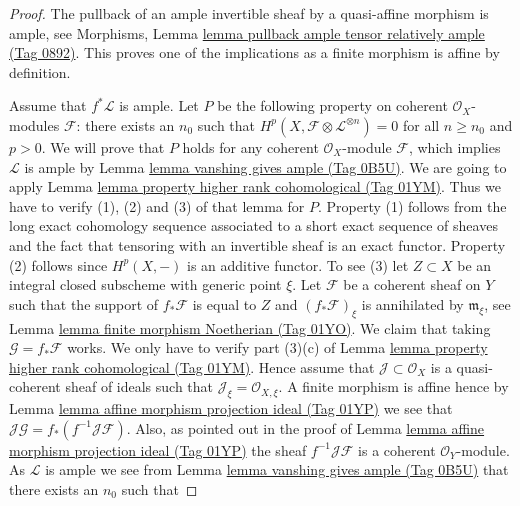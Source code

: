 \documentclass{amsart}
\theoremstyle{plain}
\theoremstyle{definition}
\theoremstyle{remark}
\numberwithin{equation}{subsection}
\begin{document}
\begin{proof}
The pullback of an ample invertible sheaf by a quasi-affine morphism
is ample, see Morphisms, Lemma
\href{https://stacks.math.columbia.edu/tag/0892}{lemma pullback ample tensor relatively ample (Tag 0892)}.
This proves one of the implications as a finite morphism is affine
by definition.

\medskip\noindent
Assume that $f^*\mathcal{L}$ is ample. Let $P$ be the following property on
coherent $\mathcal{O}_X$-modules $\mathcal{F}$: there exists an $n_0$
such that $H^p(X, \mathcal{F} \otimes \mathcal{L}^{\otimes n}) = 0$
for all $n \geq n_0$ and $p > 0$. We will prove that $P$ holds
for any coherent $\mathcal{O}_X$-module $\mathcal{F}$, which implies
$\mathcal{L}$ is ample by Lemma \href{https://stacks.math.columbia.edu/tag/0B5U}{lemma vanshing gives ample (Tag 0B5U)}.
We are going to apply Lemma \href{https://stacks.math.columbia.edu/tag/01YM}{lemma property higher rank cohomological (Tag 01YM)}.
Thus we have to verify (1), (2) and (3) of that lemma for $P$.
Property (1) follows from the long exact cohomology sequence associated
to a short exact sequence of sheaves and the fact that tensoring with
an invertible sheaf is an exact functor. Property (2) follows since
$H^p(X, -)$ is an additive functor. To see (3) let $Z \subset X$ be
an integral closed subscheme with generic point $\xi$.
Let $\mathcal{F}$ be a coherent sheaf on $Y$ such that
the support of $f_*\mathcal{F}$ is equal to $Z$
and $(f_*\mathcal{F})_\xi$ is annihilated by $\mathfrak m_\xi$,
see Lemma \href{https://stacks.math.columbia.edu/tag/01YO}{lemma finite morphism Noetherian (Tag 01YO)}. We claim that
taking $\mathcal{G} = f_*\mathcal{F}$ works. We only have to verify
part (3)(c) of Lemma \href{https://stacks.math.columbia.edu/tag/01YM}{lemma property higher rank cohomological (Tag 01YM)}.
Hence assume that $\mathcal{J} \subset \mathcal{O}_X$ is a
quasi-coherent sheaf of ideals such that
$\mathcal{J}_\xi = \mathcal{O}_{X, \xi}$.
A finite morphism is affine hence by
Lemma \href{https://stacks.math.columbia.edu/tag/01YP}{lemma affine morphism projection ideal (Tag 01YP)} we see that
$\mathcal{J}\mathcal{G} = f_*(f^{-1}\mathcal{J}\mathcal{F})$.
Also, as pointed out in the proof of
Lemma \href{https://stacks.math.columbia.edu/tag/01YP}{lemma affine morphism projection ideal (Tag 01YP)} the sheaf
$f^{-1}\mathcal{J}\mathcal{F}$ is a coherent $\mathcal{O}_Y$-module.
As $\mathcal{L}$ is ample we see from Lemma \href{https://stacks.math.columbia.edu/tag/0B5U}{lemma vanshing gives ample (Tag 0B5U)}
that there exists an $n_0$ such that

\end{proof}
\end{document}
